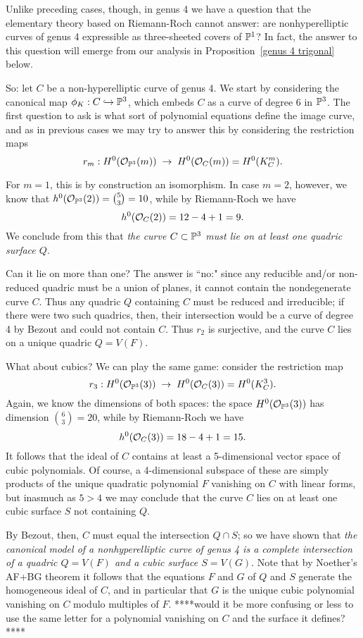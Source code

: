 \documentclass[12pt, leqno]{article}
\begin{document}
Unlike preceding cases, though, in genus 4 we have a question that the elementary theory based on Riemann-Roch cannot answer: are nonhyperelliptic curves of genus 4 expressible as three-sheeted covers of ${\mathbb P}^1$? In fact, the answer to this question will emerge from our analysis in Proposition~\ref{genus 4 trigonal} below.

So: let $C$ be a non-hyperelliptic curve of genus 4. We start by considering the canonical map $\phi_K : C \hookrightarrow {\mathbb P}^3$, which embeds $C$ as a curve of degree 6 in ${\mathbb P}^3$. The first question to ask is what sort of polynomial equations define the image curve, and as in previous cases we may try to answer this by considering the restriction maps
$$
r_m : H^0({\mathcal O}_{{\mathbb P}^3}(m)) \; \to \; H^0({\mathcal O}_{C}(m)) = H^0(K_C^m).
$$

For $m=1$, this is by construction an isomorphism. In case $m=2$, however, we know that $h^0({\mathcal O}_{{\mathbb P}^3}(2)) = \binom{5}{3} = 10$, while by Riemann-Roch we have
$$
h^0({\mathcal O}_C(2)) = 12 - 4 + 1 = 9.
$$
We conclude from this that \emph{the curve $C \subset {\mathbb P}^3$ must lie on at least one quadric surface $Q$}.

Can it lie on more than one? The answer is ``no:" since any reducible and/or non-reduced quadric must be a union of planes, it cannot contain the nondegenerate curve $C$. Thus any quadric $Q$ containing $C$ must be reduced and irreducible; if there were two such quadrics, then, their intersection would be a curve of degree 4 by Bezout and could not contain $C$. Thus $r_2$ is surjective, and the curve $C$ lies on a unique quadric $Q = V(F)$.

What about cubics? We can play the same game: consider the restriction map
$$
r_3 : H^0({\mathcal O}_{{\mathbb P}^3}(3)) \; \to \; H^0({\mathcal O}_{C}(3)) = H^0(K_C^3).
$$
Again, we know the dimensions of both spaces: the space $H^0({\mathcal O}_{{\mathbb P}^3}(3))$ has dimension $\binom{6}{3} = 20$, while by Riemann-Roch we have
$$
h^0({\mathcal O}_C(3)) = 18 - 4 + 1 = 15.
$$
It follows that the ideal of $C$ contains at least a 5-dimensional vector space of cubic polynomials. Of course, a 4-dimensional subspace of these are simply products of the unique quadratic polynomial $F$ vanishing on $C$ with linear forms, but inasmuch as $5 > 4$ we may conclude that the curve $C$ lies on at least one cubic surface $S$ not containing $Q$. 

By Bezout, then, $C$ must equal the intersection $Q \cap S$; so we have shown that \emph{the canonical model of a nonhyperelliptic curve of genus 4 is a complete intersection of a quadric $Q = V(F)$ and a cubic surface $S = V(G)$}. Note that by Noether's AF+BG theorem it follows that the equations $F$ and $G$ of $Q$ and $S$ generate the homogeneous ideal of  $C$, and in particular that $G$ is the unique cubic polynomial vanishing on $C$ modulo multiples of $F$. ****would it be more confusing or less to use the same letter for a polynomial vanishing on $C$ and the surface it defines?****
\end{document}
